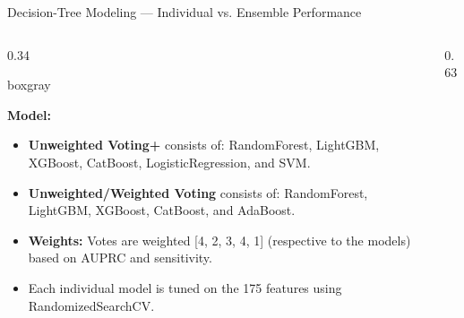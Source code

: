 \documentclass[10pt,aspectratio=169]{beamer}
\begin{document}
\begin{frame}{Decision-Tree Modeling --- Individual vs. Ensemble Performance}
  
  \setlength{\tabcolsep}{3.5pt}
  
  \begin{columns}[T, onlytextwidth]
    
    \begin{column}{0.34\textwidth}
      \vspace{0.2em}
      \begin{beamercolorbox}[wd=\textwidth,rounded=true,leftskip=0.8em,rightskip=0.8em,topskip=0.8em,bottomskip=0.8em]{boxgray}
        
        \color{coolgray}
        
     
        \textbf{Model:}
\begin{itemize}
    \item \textbf{Unweighted Voting+} consists of: RandomForest, LightGBM, XGBoost, CatBoost, LogisticRegression, and SVM.
    \item \textbf{Unweighted/Weighted Voting} consists of: RandomForest, LightGBM, XGBoost, CatBoost, and AdaBoost.
    \item \textbf{Weights:} Votes are weighted [4, 2, 3, 4, 1] (respective to the models) based on AUPRC and sensitivity.
    \item Each individual model is tuned on the 175 features using RandomizedSearchCV.
\end{itemize}
        
      \end{beamercolorbox}
    \end{column}
    
    \begin{column}{0.63\textwidth}
      \centering
      

\end{column}
\end{columns}
\end{frame}
\end{document}
